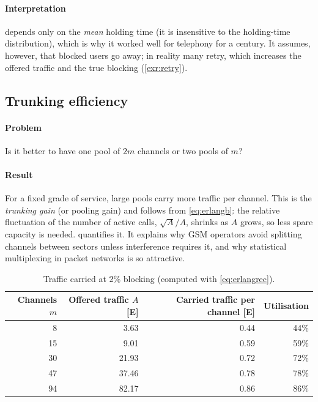 \documentclass[11pt,a4paper]{article}
\begin{document}
\paragraph{Interpretation}  depends only on the \emph{mean} holding time
(it is insensitive to the holding-time distribution), which is why it worked well for
telephony for a century. It assumes, however, that blocked users go away; in reality many
retry, which increases the offered traffic and the true blocking (\cref{exr:retry}).

\begin{acnfigure}
  \caption{Erlang-B blocking probability versus offered traffic for $m = 8$, 30 and 94
  channels. For the same 2\% grade of service, 8 channels carry 3.6\,E (0.45\,E per channel)
  whereas 94 channels carry 82.2\,E (0.87\,E per channel).}
  \label{fig:erlang}
\end{acnfigure}

\subsection{Trunking efficiency}
\paragraph{Problem} Is it better to have one pool of $2m$ channels or two pools of $m$?
\paragraph{Result} For a fixed grade of service, large pools carry more traffic per channel.
This is the \emph{trunking gain} (or pooling gain) and follows from \cref{eq:erlangb}: the
relative fluctuation of the number of active calls, $\sqrt{A}/A$, shrinks as $A$ grows, so
less spare capacity is needed.  quantifies it. It explains why GSM
operators avoid splitting channels between sectors unless interference requires it, and
why statistical multiplexing in packet networks is so attractive.

\begin{table}[htbp]
\centering\small
\caption{Traffic carried at 2\% blocking (computed with \cref{eq:erlangrec}).}\label{tab:trunking}
\begin{tabular}{@{}rrrr@{}}
\toprule
Channels $m$ & Offered traffic $A$ [E] & Carried traffic per channel [E] & Utilisation \\
\midrule
8  & 3.63  & 0.44 & 44\% \\
15 & 9.01  & 0.59 & 59\% \\
30 & 21.93 & 0.72 & 72\% \\
47 & 37.46 & 0.78 & 78\% \\
94 & 82.17 & 0.86 & 86\% \\
\bottomrule
\end{tabular}
\end{table}
\end{document}
